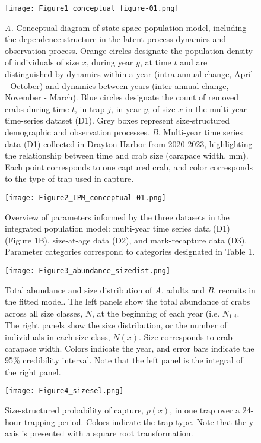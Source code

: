 \documentclass{article}
\begin{document}
\begin{figure}[H]
    \centering
    \texttt{[image: Figure1\_conceptual\_figure-01.png]}
    \caption{\textit{A.} Conceptual diagram of state-space population model, including the dependence structure in the latent process dynamics and observation process. Orange circles designate the population density of individuals of size $x$, during year $y$, at time $t$ and are distinguished by dynamics within a year (intra-annual change, April - October) and dynamics between years (inter-annual change, November - March). Blue circles designate the count of removed crabs during time $t$, in trap $j$, in year $y$, of size $x$ in the multi-year time-series dataset (D1). Grey boxes represent size-structured demographic and observation processes. \textit{B.} Multi-year time series data (D1) collected in Drayton Harbor from 2020-2023, highlighting the relationship between time and crab size (carapace width, mm). Each point corresponds to one captured crab, and color corresponds to the type of trap used in capture.}
\end{figure}

\begin{figure}[H]
    \centering
    \texttt{[image: Figure2\_IPM\_conceptual-01.png]}
    \caption{Overview of parameters informed by the three datasets in the integrated population model: multi-year time series data (D1) (Figure 1B), size-at-age data (D2), and mark-recapture data (D3). Parameter categories correspond to categories designated in Table 1.}
\end{figure}

\begin{figure}[H]
    \centering
    \texttt{[image: Figure3\_abundance\_sizedist.png]}
    \caption{Total abundance and size distribution of \textit{A.} adults and \textit{B.} recruits in the fitted model. The left panels show the total abundance of crabs across all size classes, $N$, at the beginning of each year (i.e. $N_{1, i}$. The right panels show the size distribution, or the number of individuals in each size class, $N(x)$. Size corresponds to crab carapace width. Colors indicate the year, and error bars indicate the 95\% credibility interval. Note that the left panel is the integral of the right panel.}
\end{figure}

\begin{figure}[H]
    \centering
    \texttt{[image: Figure4\_sizesel.png]}
    \caption{Size-structured probability of capture, $p(x)$, in one trap over a 24-hour trapping period. Colors indicate the trap type. Note that the y-axis is presented with a square root transformation.}
\end{figure}
\end{document}
